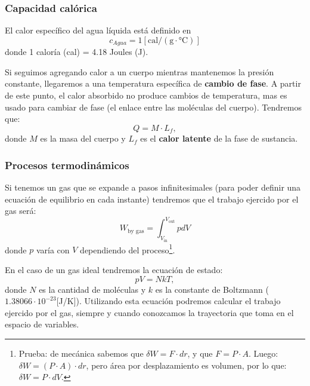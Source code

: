 \documentclass[]{article}
\numberwithin{equation}{section}
\newcommand{\0}{\textcolor{gray}{0}}
\begin{document}
\subsubsection{Capacidad calórica}

El calor específico del agua líquida está definido en
\begin{equation*}
	c_{Agua} = 1 [\text{cal}/(\text{g}\cdot \text{°C})]
\end{equation*}
donde 1 caloría (cal) = 4.18 Joules (J).

Si seguimos agregando calor a un cuerpo mientras mantenemos la presión constante, llegaremos a una temperatura específica de \textbf{cambio de fase}. A partir de este punto, el calor absorbido no produce cambios de temperatura, mas es usado para cambiar de fase (el enlace entre las moléculas del cuerpo). Tendremos que:
\begin{equation}
	Q = M\cdot L_f,
\end{equation}
donde $M$ es la masa del cuerpo y $L_f$ es el \textbf{calor latente} de la fase de sustancia.

\subsubsection{Procesos termodinámicos}

Si tenemos un gas que se expande a pasos infinitesimales (para poder definir una ecuación de equilibrio en cada instante) tendremos que el trabajo ejercido por el gas será:
\begin{equation}
	W_{\text{by gas}} = \int_{V_{\text{in}}}^{V_{\text{out}}}pdV
\end{equation}
donde $p$ varía con $V$ dependiendo del proceso\footnote{Prueba: de mecánica sabemos que $\delta W = F\cdot dr$, y que $F=P\cdot A$. Luego: $\delta W = (P\cdot A)\cdot dr$, pero área por desplazamiento es volumen, por lo que: $\delta W = P\cdot dV$.}.

En el caso de un gas ideal tendremos la ecuación de estado:
\begin{equation}
	pV=NkT,
	\label{eqn:gases_ideales}
\end{equation}
donde $N$ es la cantidad de moléculas y $k$ es la constante de Boltzmann ($1.38066 \cdot 10^{-23} $[J/K]). Utilizando esta ecuación podremos calcular el trabajo ejercido por el gas, siempre y cuando conozcamos la trayectoria que toma en el espacio de variables.
\end{document}
